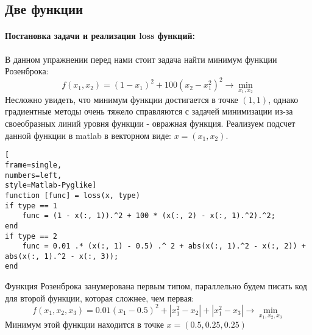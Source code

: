 \documentclass[12pt]{article}
\begin{document}
\subsection{Две функции}
\paragraph{Постановка задачи и реализация loss функций:}
В данном упражнении перед нами стоит задача найти минимум функции Розенброка:
\begin{equation*}
	f(x_1, x_2) = (1-x_1)^2 + 100 (x_2 - x_1^2)^2 \rightarrow \min_{x_1, x_2}
\end{equation*}
Несложно увидеть, что минимум функции достигается в точке $(1,1)$, однако градиентные методы очень тяжело справляются с задачей минимизации из-за своеобразных линий уровня функции - овражная функция. Реализуем подсчет данной функции в matlab в векторном виде: $x = (x_1, x_2)$. 
\begin{lstlisting}[
frame=single,
numbers=left,
style=Matlab-Pyglike]
function [func] = loss(x, type)
if type == 1
    func = (1 - x(:, 1)).^2 + 100 * (x(:, 2) - x(:, 1).^2).^2;
end
if type == 2
    func = 0.01 .* (x(:, 1) - 0.5) .^ 2 + abs(x(:, 1).^2 - x(:, 2)) + abs(x(:, 1).^2 - x(:, 3));
end
\end{lstlisting}
Функция Розенброка занумерована первым типом, параллельно будем писать код для второй функции, которая сложнее, чем первая:
\begin{equation*}
	f(x_1, x_2, x_3) = 0.01(x_1-0.5)^2 + |x_1^2 - x_2| + |x_1^2 - x_3| \rightarrow \min_{x_1, x_2, x_3}
\end{equation*}
Минимум этой функции находится в точке $x = (0.5, 0.25, 0.25)$
\end{document}

